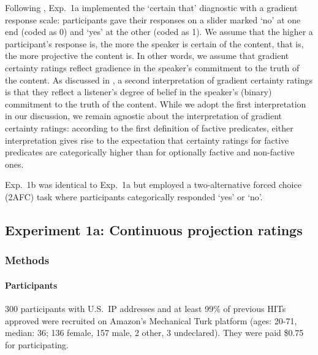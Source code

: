 \documentclass[11pt,fleqn]{article}
\newcommand{\6}{\mbox{$[\hspace*{-.6mm}[$}}
\newcommand{\9}{\mbox{$]\hspace*{-.6mm}]$}}
\begin{document}
Following \citealt{tbd-variability}, Exp.~1a implemented the `certain that' diagnostic with a gradient response scale: participants gave their responses on a slider marked `no' at one end (coded as 0) and `yes' at the other (coded as 1). We assume that the higher a participant's response is, the more the speaker is certain of the content, that is, the more projective the content is. In other words, we assume that gradient certainty ratings reflect gradience in the speaker's commitment to the truth of the content. As discussed in \citealt{tbd-variability}, a second interpretation of gradient certainty ratings is that they reflect a listener's degree of belief in the speaker's (binary) commitment to the truth of the content. While we adopt the first interpretation in our discussion, we remain agnostic about the interpretation of gradient certainty ratings:  according to the first definition of factive predicates, either interpretation gives rise to the expectation that certainty ratings for factive predicates are categorically higher than for optionally factive and non-factive ones. 

Exp.~1b was identical to Exp.~1a but employed a two-alternative forced choice (2AFC) task where participants categorically responded `yes' or `no'.
 
\subsection{Experiment 1a: Continuous projection ratings}

\subsubsection{Methods}

\paragraph{Participants} 300 participants with U.S.\ IP addresses and at least 99\% of previous HITs approved were recruited on Amazon's Mechanical Turk platform (ages: 20-71, median: 36; 136 female, 157 male, 2 other, 3 undeclared). They were paid \$0.75 for participating.
\end{document}
